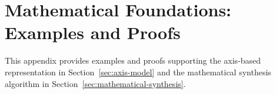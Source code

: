 \section{Mathematical Foundations: Examples and Proofs}
\label{app:foundations}
This appendix provides examples and proofs supporting the axis-based
representation in Section~\ref{sec:axis-model} and the mathematical
synthesis algorithm in Section~\ref{sec:mathematical-synthesis}.


\FloatBarrier

\FloatBarrier

\FloatBarrier

\FloatBarrier

\FloatBarrier
